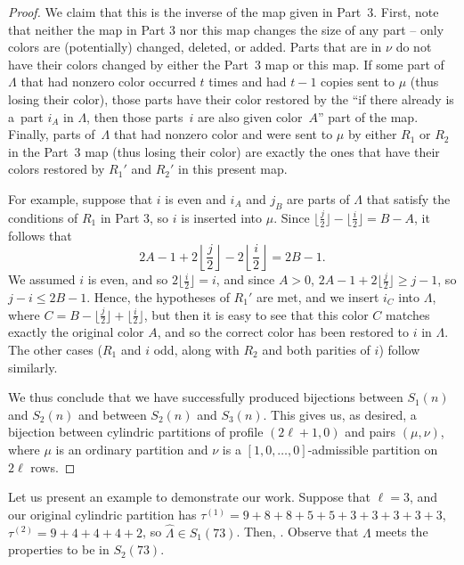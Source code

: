 \documentclass[10pt,a4paper]{amsart}
\numberwithin{equation}{section}
\theoremstyle{definition}
\newcommand{\LH}{{\widehat{\Lambda}}}
\begin{document}
\begin{proof}
We claim that this is the inverse of the map given in Part~3. First, note that neither the map in Part 3 nor this map changes the size of any part -- only colors are (potentially) changed, deleted, or added. Parts that are in $\nu$ do not have their colors changed by either the Part~3 map or this map. If some part of $\Lambda$ that had nonzero color occurred $t$ times and had $t-1$ copies sent to $\mu$ (thus losing their color), those parts have their color restored by the ``if there already is a~part $i_A$ in $\Lambda$, then those parts~$i$ are also given color~$A$'' part of the map. Finally, parts of~$\Lambda$ that had nonzero color and were sent to $\mu$ by either $R_1$ or $R_2$ in the Part~3 map (thus losing their color) are exactly the ones that have their colors restored by $R_1'$ and $R_2'$ in this present map.

For example, suppose that $i$ is even and $i_A$ and $j_B$ are parts of $\Lambda$ that satisfy the conditions of $R_1$ in Part 3, so $i$ is inserted into $\mu$. Since $\bigl\lfloor\frac j2\bigr\rfloor-\bigl\lfloor\frac i2\bigr\rfloor=B-A$, it follows that
\begin{equation*}
2A-1+2\left\lfloor\frac j2\right\rfloor-2\left\lfloor\frac i2\right\rfloor=2B-1.
\end{equation*}
We assumed $i$ is even, and so $ 2\bigl\lfloor\frac i2\bigr\rfloor=i$, and since $A>0$, $2A-1+2\bigl\lfloor\frac j2\bigr\rfloor\ge j-1$, so $j-i\le 2B-1$. Hence, the hypotheses of $R_1'$ are met, and we insert $i_C$ into $\Lambda$, where $ C=B-\bigl\lfloor\frac j2\bigr\rfloor+\bigl\lfloor\frac i2\bigr\rfloor$, but then it is easy to see that this color $C$ matches exactly the original color $A$, and so the correct color has been restored to $i$ in $\Lambda$. The other cases ($R_1$ and $i$ odd, along with $R_2$ and both parities of $i$) follow similarly.

We thus conclude that we have successfully produced bijections between $S_1(n)$ and $S_2(n)$ and between $S_2(n)$ and $S_3(n)$. This gives us, as desired, a bijection between cylindric partitions of profile $(2\ell+1,0)$ and pairs $(\mu,\nu)$, where $\mu$ is an ordinary partition and $\nu$ is a $[1,0,\dots,0]$-admissible partition on $2\ell$ rows.
\end{proof}

Let us present an example to demonstrate our work. Suppose that $\ell=3$, and our original cylindric partition \smash{$\LH=\bigl(\tau^{(1)},\tau^{(2)}\bigr)$} has
$\tau^{(1)}=9+8+8+5+5+3+3+3+3+3$,
$\tau^{(2)}=9+4+4+4+2$, so $\LH \in S_1(73)$.
Then,
.
Observe that $\Lambda$ meets the properties to be in $S_2(73)$.
\end{document}
